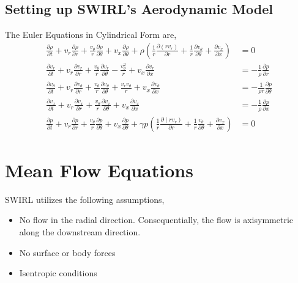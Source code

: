 \subsection{Setting up SWIRL's Aerodynamic Model}
The Euler Equations in Cylindrical Form are,
\begin{align*}
\frac{\partial \rho}{\partial t} + %
v_r \frac{\partial \rho}{\partial r} +
\frac{v_{\theta}   }{r}
\frac{\partial \rho}{\partial \theta} +
v_x \frac{\partial \rho}{\partial \theta} + 
\rho 
\left(
\frac{1}{r} \frac{\partial (rv_r)	}{\partial r} +
\frac{1}{r}	\frac{\partial v_{\theta}}{\partial \theta} +
\frac{\partial v_x}{\partial x}
\right) 
&= 0 \\%
\frac{\partial v_r}{\partial t} + 
v_r \frac{\partial v_r}{\partial r} +
\frac{v_{\theta}  }{r}
\frac{\partial v_r}{\partial \theta}- \frac{v_{\theta}^2}{r}+ 
v_x \frac{\partial v_r}{\partial x} 
&= -\frac{1}{\rho} \frac{\partial p}{\partial r}\\  
\frac{\partial v_{\theta}}{\partial t} + 
v_r \frac{\partial v_{\theta}}{\partial r} +
\frac{v_{\theta}}{r}
\frac{\partial v_{\theta}}{\partial \theta} +
\frac{v_r v_{\theta}}{r}+ 
v_x \frac{\partial v_{\theta}}{\partial x} 
&= -\frac{1}{\rho r} \frac{\partial p}{\partial \theta}\\ 
\frac{\partial v_{x}}{\partial t} + 
v_r 
\frac{\partial v_x}{\partial r} +
\frac{v_{\theta}}{r}
\frac{\partial v_x}{\partial \theta}+ 
v_x \frac{\partial v_x}{\partial x} 
&= 
-\frac{1}{\rho } 
\frac{\partial p}{\partial x}\\  
\frac{\partial p }{\partial t} +
v_r 
\frac{\partial p}{\partial r} +
\frac{v_{\theta}}{r}
\frac{\partial p}{\partial \theta} +
v_x \frac{\partial p}{\partial \theta} + 
\gamma p 
\left(
\frac{1}{r}\frac{\partial (rv_r)}{\partial r} +
\frac{1}{r}\frac{v_{\theta}}{\partial \theta} +
\frac{\partial v_x}{\partial x}
\right) &= 0
\end{align*}


\section{Mean Flow Equations}

SWIRL utilizes the following assumptions,

\begin{itemize}
    \item No flow in the radial direction. Consequentially, the flow is 
        axisymmetric along the downstream direction.
    \item No surface or body forces
    \item Isentropic conditions 
\end{itemize}

